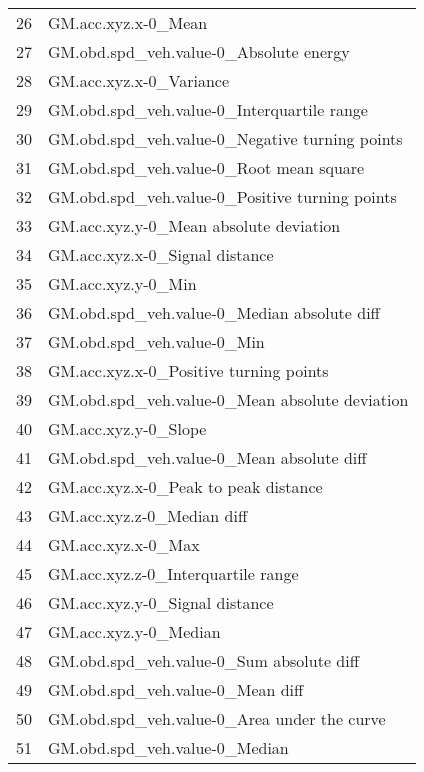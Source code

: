 \begin{tabular}{ll}
26  &                               GM.acc.xyz.x-0\_Mean \\
27  &            GM.obd.spd\_veh.value-0\_Absolute energy \\
28  &                           GM.acc.xyz.x-0\_Variance \\
29  &        GM.obd.spd\_veh.value-0\_Interquartile range \\
30  &    GM.obd.spd\_veh.value-0\_Negative turning points \\
31  &           GM.obd.spd\_veh.value-0\_Root mean square \\
32  &    GM.obd.spd\_veh.value-0\_Positive turning points \\
33  &            GM.acc.xyz.y-0\_Mean absolute deviation \\
34  &                    GM.acc.xyz.x-0\_Signal distance \\
35  &                                GM.acc.xyz.y-0\_Min \\
36  &       GM.obd.spd\_veh.value-0\_Median absolute diff \\
37  &                        GM.obd.spd\_veh.value-0\_Min \\
38  &            GM.acc.xyz.x-0\_Positive turning points \\
39  &    GM.obd.spd\_veh.value-0\_Mean absolute deviation \\
40  &                              GM.acc.xyz.y-0\_Slope \\
41  &         GM.obd.spd\_veh.value-0\_Mean absolute diff \\
42  &              GM.acc.xyz.x-0\_Peak to peak distance \\
43  &                        GM.acc.xyz.z-0\_Median diff \\
44  &                                GM.acc.xyz.x-0\_Max \\
45  &                GM.acc.xyz.z-0\_Interquartile range \\
46  &                    GM.acc.xyz.y-0\_Signal distance \\
47  &                             GM.acc.xyz.y-0\_Median \\
48  &          GM.obd.spd\_veh.value-0\_Sum absolute diff \\
49  &                  GM.obd.spd\_veh.value-0\_Mean diff \\
50  &       GM.obd.spd\_veh.value-0\_Area under the curve \\
51  &                     GM.obd.spd\_veh.value-0\_Median \\

\end{tabular}
